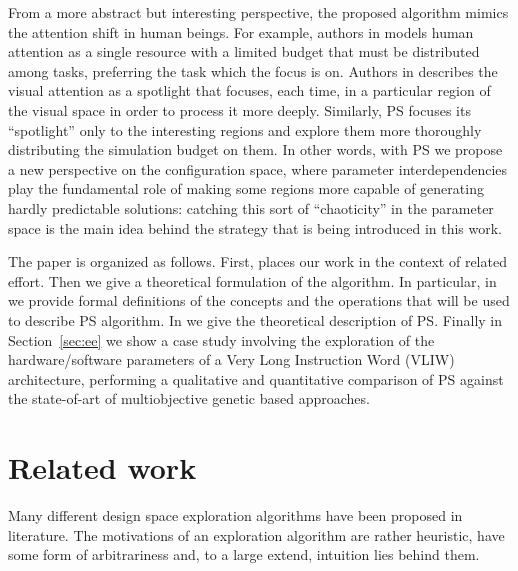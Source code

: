 From a more abstract but interesting perspective, the proposed
algorithm mimics the attention shift in human beings. For example,
authors in \cite{attention} models human attention as a single
resource with a limited budget that must be distributed among tasks,
preferring the task which the focus is on.  Authors in
\cite{spatial_attention} describes the visual attention as a spotlight
that focuses, each time, in a particular region of the visual space in
order to process it more deeply. Similarly, PS focuses its
``spotlight'' only to the interesting regions and explore them more
thoroughly distributing the simulation budget on them.
In other words, with PS we propose a new perspective on the configuration space,
where parameter interdependencies play the fundamental role of making
some regions more capable of generating hardly predictable solutions:
catching this sort of ``chaoticity'' in the parameter space is the
main idea behind the strategy that is being introduced in this work.


The paper is organized as follows. First,  places our work in the context of related effort.
Then we give a theoretical formulation of the algorithm. In particular, in  we provide formal definitions of the concepts and the operations that will be used to describe PS algorithm. In  we give the theoretical description of PS. 
Finally in Section~\ref{sec:ee} we show a case
study involving the exploration of the hardware/software parameters of
a Very Long Instruction Word (VLIW) architecture, performing a
qualitative and quantitative comparison of PS against the state-of-art
of multiobjective genetic based approaches.


\section{Related work}
Many different design space exploration algorithms have been proposed
in literature.  The motivations of an exploration
algorithm are rather heuristic, have some form of arbitrariness and,
to a large extend, intuition lies behind them.

